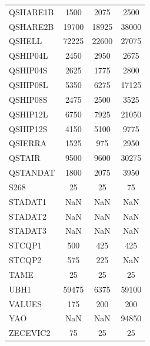 \begin{longtable}{lccc}
QSHARE1B &     1500 &     2075 &     2500 \\
QSHARE2B &    19700 &    18925 &    38000 \\
QSHELL   &    72225 &    22600 &    27075 \\
QSHIP04L &     2450 &     2950 &     2675 \\
QSHIP04S &     2625 &     1775 &     2800 \\
QSHIP08L &     5350 &     6275 &    17125 \\
QSHIP08S &     2475 &     2500 &     3525 \\
QSHIP12L &     6750 &     7925 &    21050 \\
QSHIP12S &     4150 &     5100 &     9775 \\
QSIERRA  &     1525 &      975 &     2950 \\
QSTAIR   &     9500 &     9600 &    30275 \\
QSTANDAT &     1800 &     2075 &     3950 \\
S268     &       25 &       25 &       75 \\
STADAT1  &      NaN &      NaN &      NaN \\
STADAT2  &      NaN &      NaN &      NaN \\
STADAT3  &      NaN &      NaN &      NaN \\
STCQP1   &      500 &      425 &      425 \\
STCQP2   &      575 &      225 &      NaN \\
TAME     &       25 &       25 &       25 \\
UBH1     &    59475 &     6375 &    59100 \\
VALUES   &      175 &      200 &      200 \\
YAO      &      NaN &      NaN &    94850 \\
ZECEVIC2 &       75 &       25 &       25 \\
\end{longtable}
